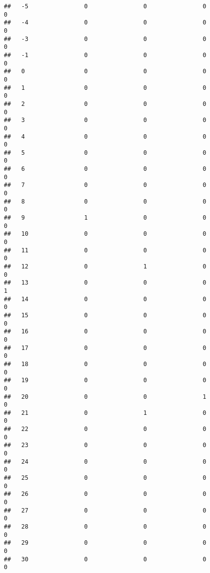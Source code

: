 \documentclass[]{article}
\begin{document}
\begin{verbatim}
##   -5                0                0                0                0
##   -4                0                0                0                0
##   -3                0                0                0                0
##   -1                0                0                0                0
##   0                 0                0                0                0
##   1                 0                0                0                0
##   2                 0                0                0                0
##   3                 0                0                0                0
##   4                 0                0                0                0
##   5                 0                0                0                0
##   6                 0                0                0                0
##   7                 0                0                0                0
##   8                 0                0                0                0
##   9                 1                0                0                0
##   10                0                0                0                0
##   11                0                0                0                0
##   12                0                1                0                0
##   13                0                0                0                1
##   14                0                0                0                0
##   15                0                0                0                0
##   16                0                0                0                0
##   17                0                0                0                0
##   18                0                0                0                0
##   19                0                0                0                0
##   20                0                0                1                0
##   21                0                1                0                0
##   22                0                0                0                0
##   23                0                0                0                0
##   24                0                0                0                0
##   25                0                0                0                0
##   26                0                0                0                0
##   27                0                0                0                0
##   28                0                0                0                0
##   29                0                0                0                0
##   30                0                0                0                0

\end{verbatim}
\end{document}
